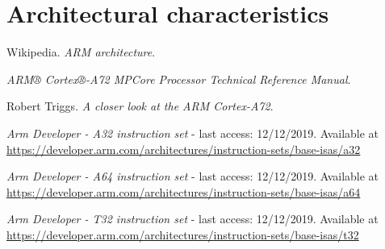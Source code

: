 \documentclass[12pt]{article}
\begin{document}
\section{Architectural characteristics}




\newpage
\begin{thebibliography}{9}
Wikipedia.
\textit{ARM architecture}. 

 
\textit{ARM® Cortex®-A72 MPCore Processor Technical Reference Manual}.

 
Robert Triggs. \textit{A closer look at the ARM Cortex-A72}.


\textit{Arm Developer - A32 instruction set} - last access: 12/12/2019. Available at \url{https://developer.arm.com/architectures/instruction-sets/base-isas/a32}



\textit{Arm Developer - A64 instruction set} - last access: 12/12/2019. Available at \url{https://developer.arm.com/architectures/instruction-sets/base-isas/a64}

\textit{Arm Developer - T32 instruction set} - last access: 12/12/2019. Available at \url{https://developer.arm.com/architectures/instruction-sets/base-isas/t32}

\end{thebibliography}
\end{document}

